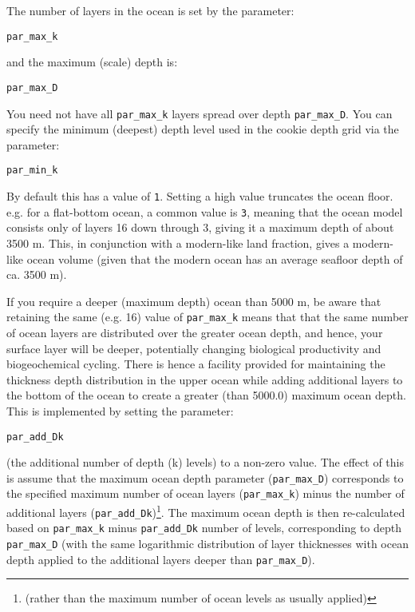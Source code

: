 The number of layers in the ocean is set by the parameter:

\vspace{1mm}
\texttt{par\_max\_k}
\vspace{1mm}

\noindent and the maximum (scale) depth is:

\vspace{1mm}
\texttt{par\_max\_D}
\vspace{1mm}

You need not have all \texttt{par\_max\_k} layers spread over depth \texttt{par\_max\_D}. You can specify the minimum (deepest) depth level used in the cookie depth grid via the parameter:

\vspace{1mm}
\texttt{par\_min\_k}
\vspace{1mm}

\noindent By default this has a value of \texttt{1}. Setting a high value truncates the ocean floor. e.g. for a flat-bottom ocean, a common value is \texttt{3}, meaning that the ocean model consists only of layers 16 down through 3, giving it a maximum depth of about 3500 m. This, in conjunction with a modern-like land fraction, gives a modern-like ocean volume (given that the modern ocean has an average seafloor depth of ca. 3500 m).

If you require a deeper (maximum depth) ocean than 5000 m, be aware that retaining the same (e.g. 16) value of \texttt{par\_max\_k} means that that the same number of ocean layers are distributed over the greater ocean depth, and hence, your surface layer will be deeper, potentially changing biological productivity and biogeochemical cycling. There is hence a facility provided for maintaining the thickness depth distribution in the upper ocean while adding additional layers to the bottom of the ocean to create a greater (than 5000.0) maximum ocean depth. This is implemented by setting the parameter:

\vspace{1mm}
\texttt{par\_add\_Dk}
\vspace{1mm}

\noindent (the additional number of depth (k) levels) to a non-zero value. The effect of this is assume that the maximum ocean depth parameter (\texttt{par\_max\_D}) corresponds to the specified maximum number of ocean layers (\texttt{par\_max\_k}) minus the number of additional layers (\texttt{par\_add\_Dk})\footnote{(rather than the maximum number of ocean levels as usually applied)}.  The maximum ocean depth is then re-calculated based on \texttt{par\_max\_k} minus \texttt{par\_add\_Dk} number of levels, corresponding to depth \texttt{par\_max\_D} (with the same logarithmic distribution of layer thicknesses with ocean depth applied to the additional layers deeper than \texttt{par\_max\_D}).

